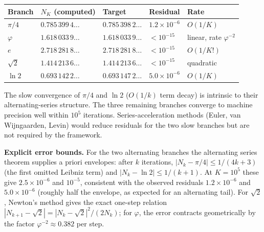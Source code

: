 \documentclass[
  11pt,
  letterpaper,
]{article}
\begin{document}
\begin{longtable}[]{@{}
  >{\raggedright\arraybackslash}p{}
  >{\raggedright\arraybackslash}p{}
  >{\raggedright\arraybackslash}p{}
  >{\raggedright\arraybackslash}p{}
  >{\raggedright\arraybackslash}p{}@{}}
\toprule\noalign{}
\begin{minipage}[b]{\linewidth}\raggedright
Branch
\end{minipage} & \begin{minipage}[b]{\linewidth}\raggedright
\(N_K\) (computed)
\end{minipage} & \begin{minipage}[b]{\linewidth}\raggedright
Target
\end{minipage} & \begin{minipage}[b]{\linewidth}\raggedright
Residual
\end{minipage} & \begin{minipage}[b]{\linewidth}\raggedright
Rate
\end{minipage} \\
\midrule\noalign{}
\endhead
\bottomrule\noalign{}
\endlastfoot
\(\pi/4\) & \(0.785\,399\,4\ldots\) & \(0.785\,398\,2\ldots\) &
\(1.2 \times 10^{-6}\) & \(O(1/K)\) \\
\(\varphi\) & \(1.618\,033\,9\ldots\) & \(1.618\,033\,9\ldots\) &
\(< 10^{-15}\) & linear, rate \(\varphi^{-2}\) \\
\(e\) & \(2.718\,281\,8\ldots\) & \(2.718\,281\,8\ldots\) &
\(< 10^{-15}\) & \(O(1/K!)\) \\
\(\sqrt{2}\) & \(1.414\,213\,6\ldots\) & \(1.414\,213\,6\ldots\) &
\(< 10^{-15}\) & quadratic \\
\(\ln 2\) & \(0.693\,142\,2\ldots\) & \(0.693\,147\,2\ldots\) &
\(5.0 \times 10^{-6}\) & \(O(1/K)\) \\
\end{longtable}

The slow convergence of \(\pi/4\) and \(\ln 2\) (\(O(1/k)\) term decay)
is intrinsic to their alternating-series structure. The three remaining
branches converge to machine precision well within \(10^5\) iterations.
Series-acceleration methods (Euler, van Wijngaarden, Levin) would reduce
residuals for the two slow branches but are not required by the
framework.

\textbf{Explicit error bounds.} For the two alternating branches the
alternating series theorem supplies a priori envelopes: after \(k\)
iterations, \(|N_k - \pi/4| \leq 1/(4k+3)\) (the first omitted Leibniz
term) and \(|N_k - \ln 2| \leq 1/(k+1)\). At \(K = 10^5\) these give
\(2.5 \times 10^{-6}\) and \(10^{-5}\), consistent with the observed
residuals \(1.2 \times 10^{-6}\) and \(5.0 \times 10^{-6}\) (roughly
half the envelope, as expected for an alternating tail). For
\(\sqrt{2}\), Newton's method gives the exact one-step relation
\(|N_{k+1} - \sqrt{2}| = |N_k - \sqrt{2}|^2 / (2N_k)\); for \(\varphi\),
the error contracts geometrically by the factor
\(\varphi^{-2} \approx 0.382\) per step.
\end{document}
